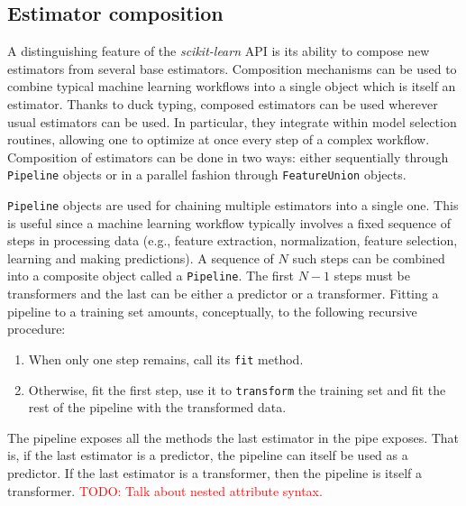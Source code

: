 \documentclass{llncs}
\newcommand{\sklearn}{\textit{scikit-learn}\xspace}
\begin{document}


\subsection{Estimator composition}

A distinguishing feature of the \sklearn API is its ability to
compose new estimators from several base estimators. Composition mechanisms can
be used to combine typical machine learning workflows into a single object which
is itself an estimator. Thanks to duck typing, composed
estimators can be used wherever usual estimators can be used. In particular,
they integrate within model selection routines, allowing one to optimize at once
every step of a complex workflow. Composition of estimators can be done in two
ways: either sequentially through \texttt{Pipeline} objects or in a parallel
fashion through \texttt{FeatureUnion} objects.

\texttt{Pipeline} objects are used for chaining multiple estimators into a
single one. This is useful since a machine learning workflow typically involves
a fixed sequence of steps in processing data (e.g., feature extraction,
normalization, feature selection, learning and making predictions).
A sequence of $N$ such steps can be combined into a composite object
called a \texttt{Pipeline}.
The first $N-1$ steps must be transformers
and the last can be either a predictor or a transformer.
Fitting a pipeline to a training set amounts, conceptually,
to the following recursive procedure:
\begin{enumerate}
  \item When only one step remains, call its \texttt{fit} method.
  \item Otherwise, fit the first step,
        use it to \texttt{transform} the training set
        and fit the rest of the pipeline with the transformed data.
\end{enumerate}
The pipeline exposes all the methods the last
estimator in the pipe exposes. That is, if the last estimator is a predictor,
the pipeline can itself be used as a predictor. If the last estimator is a
transformer, then the pipeline is itself a transformer. \textcolor{red}{TODO:
Talk about nested attribute syntax.}
\end{document}

